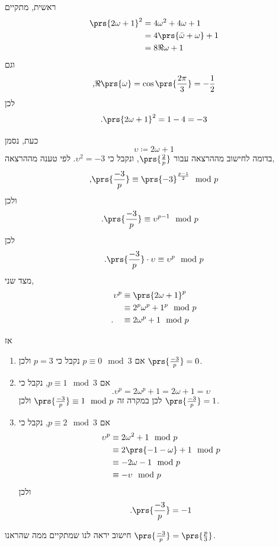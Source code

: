 \documentclass[a4paper,10pt,twoside,openany]{book}
\begin{document}
\begin{solution}
ראשית, מתקיים
\begin{align*}
\prs{2 \omega + 1}^2 &= 4 \omega^2 + 4 \omega + 1
\\&= 4 \prs{\bar{\omega} + \omega} + 1
\\&= 8 \Re{\omega} + 1
\end{align*}
וגם
\begin{align*}
\text{,} \Re\prs{\omega} = \cos\prs{\frac{2 \pi}{3}} = -\frac{1}{2}
\end{align*}
לכן
\[\text{.} \prs{2 \omega + 1}^2 = 1 - 4 = -3\]

כעת, נסמן
\[\upsilon \coloneqq 2 \omega + 1\]
בדומה לחישוב מההרצאה עבור
$\prs{\frac{2}{p}}$,
ונקבל כי
$\upsilon^2 = -3$.
לפי טענה מההרצאה,
\begin{align*}
\text{,} \prs{\frac{-3}{p}} \equiv \prs{-3}^{\frac{p-1}{2}} \mod{p}
\end{align*}
ולכן
\begin{align*}
\text{.} \prs{\frac{-3}{p}} &\equiv \upsilon^{p-1} \mod{p}
\end{align*}
לכן
\begin{align*}
\text{.} \prs{\frac{-3}{p}} \cdot \upsilon \equiv \upsilon^p \mod{p}
\end{align*}
מצד שני,
\begin{align*}
\upsilon^p &\equiv \prs{2 \omega + 1}^p
\\& \equiv 2^p \omega^p + 1^p \mod{p}
\\\text{.} \hphantom{\upsilon^p} & \equiv 2 \omega^p + 1 \mod{p}
\end{align*}

אז
\begin{enumerate}
\item אם
$p \equiv 0 \mod{3}$
נקבל כי
$p = 3$
ולכן
$\prs{\frac{-3}{p}} = 0$.

\item אם
$p \equiv 1 \mod{3}$,
נקבל כי
\[\text{.} \upsilon^p = 2 \omega^p + 1 = 2 \omega + 1 = \upsilon\]
לכן במקרה זה
$\prs{\frac{-3}{p}} \equiv 1 \mod{p}$
ולכן
$\prs{\frac{-3}{p}} = 1$.

\item אם
$p \equiv 2 \mod{3}$,
נקבל כי
\begin{align*}
\upsilon^p &\equiv 2 \omega^2 + 1 \mod{p}
\\&\equiv 2 \prs{-1 - \omega} + 1 \mod{p}
\\&\equiv -2 \omega - 1 \mod{p}
\\&\equiv - \upsilon \mod{p}
\end{align*}
ולכן
\begin{align*}
\text{.} \prs{\frac{-3}{p}} = -1
\end{align*}
\end{enumerate}

חישוב יראה לנו שמתקיים ממה שהראנו
$\prs{\frac{-3}{p}} = \prs{\frac{p}{3}}$.
\end{solution}
\end{document}
